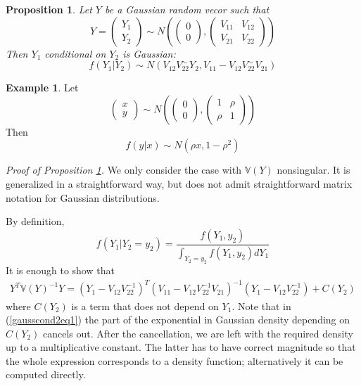 \documentclass[12pt]{article}
\newtheorem{proposition}[theorem]{Proposition}
\theoremstyle{definition}
\newtheorem{example}[theorem]{Example}
\theoremstyle{remark}
\numberwithin{equation}{section}
\newcommand{\VV}{\mathbb{V}}
\begin{document}
\begin{proposition}\label{gausscond2}
	Let $Y$ be a Gaussian random vecor such that
	\begin{equation*}
		Y = \begin{pmatrix}
			Y_1\\Y_2
	\end{pmatrix}\sim
	N\left(
	\begin{pmatrix}
		0\\0
	\end{pmatrix},
	\begin{pmatrix}
		V_{11} & V_{12}\\V_{21} & V_{22}
	\end{pmatrix}
	\right)
	\end{equation*}
	Then $Y_1$ conditional on $Y_2$ is Gaussian:
	\begin{equation*}
		f(Y_1|Y_2) \sim N(V_{12}V_{22}^{\sim}Y_2, V_{11} - V_{12}V_{22}^{\sim}V_{21})
	\end{equation*}
\end{proposition}
\begin{example}
Let
	\begin{equation*}
		\begin{pmatrix}
			x\\y
	\end{pmatrix}\sim
	N\left(
	\begin{pmatrix}
		0\\0
	\end{pmatrix},
	\begin{pmatrix}
		1 & \rho\\ \rho & 1
	\end{pmatrix}
	\right)
	\end{equation*}
	Then
	\begin{equation*}
			f(y|x) \sim N(\rho x, 1 - \rho^2)
	\end{equation*}
\end{example}
\noindent\emph{Proof of Proposition \ref{gausscond2}.} We only consider the case with $\VV(Y)$ nonsingular. It is generalized in a straightforward way, but does not admit straightforward matrix notation for Gaussian distributions.

By definition,
\begin{equation}\label{gausscond2eq1}
	f(Y_1|Y_2=y_2) = \frac{f(Y_1,y_2)}{\int_{Y_2 = y_2}f(Y_1, y_2)dY_1}
\end{equation}
It is enough to show that
\begin{align}\label{gausscond2eq2}
	Y^T\VV(Y)^{-1}Y = (Y_1 - V_{12}V_{22}^{-1})^T(V_{11}  - V_{12}V_{22}^{-1}V_{21})^{-1}(Y_1 - V_{12}V_{22}^{-1}) + C(Y_2)
\end{align}
where $C(Y_2)$ is a term that does not depend on $Y_1$. Note that in (\ref{gausscond2eq1}) the part of the exponential in Gaussian density depending on $C(Y_2)$ cancels out. After the cancellation, we are left with the required density up to a multiplicative constant. The latter has to have correct magnitude so that the whole expression corresponds to a density function; alternatively it can be computed directly.
\end{document}
